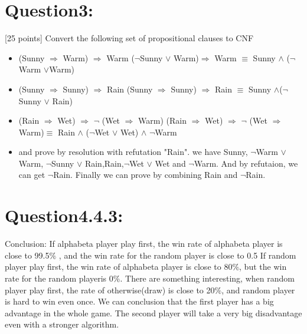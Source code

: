 \documentclass{article}
\begin{document}
\section{Question3:}
[25 points] Convert the following set of propositional clauses to CNF
\begin{itemize}
    \item (Sunny $\Rightarrow$ Warm) $\Rightarrow$ Warm\newline
    ($\neg$Sunny $\vee$ Warm)$\Rightarrow$ Warm  $\equiv$ Sunny $\wedge$ ($\neg$ Warm $\vee$Warm)

    \item (Sunny $\Rightarrow$ Sunny) $\Rightarrow$ Rain\newline
    (Sunny $\Rightarrow$ Sunny) $\Rightarrow$ Rain $\equiv$ Sunny $\wedge$($\neg$Sunny $\vee$ Rain)
    \item (Rain $\Rightarrow$ Wet) $\Rightarrow$ $\neg$ (Wet $\Rightarrow$ Warm)\newline
    (Rain $\Rightarrow$ Wet) $\Rightarrow$ $\neg$ (Wet $\Rightarrow$ Warm)$\equiv$ Rain $\wedge$ ($\neg$Wet $\vee$ Wet) $\wedge$ $\neg$Warm
    \item and prove by resolution with refutation "Rain".\newline
    we have Sunny, $\neg$Warm $\vee$ Warm, $\neg$Sunny $\vee$ Rain,Rain,$\neg$Wet $\vee$ Wet and $\neg$Warm.
    And by refutaion, we can get $\neg$Rain. Finally we can prove by combining Rain and $\neg$Rain.
\end{itemize}

\section{Question4.4.3:}
Conclusion: If alphabeta player play first, the win rate of alphabeta player is close to 99.5$\%$ , and the win rate for the random player is close to 0.5%
If random player play first, the win rate of alphabeta player is close to 80$\%$, but the win rate for the random playeris 0$\%$. There are something interesting,
when random player play first, the rate of otherwise(draw) is close to 20$\%$, and random player is hard to win even once.
We can conclusion that the first player has a big advantage in the whole game. The second player will take a very big disadvantage even with a stronger algorithm.
\end{document}
